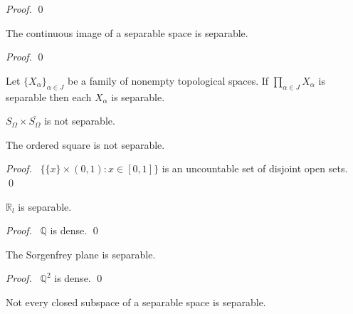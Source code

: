 \begin{proof}
 \pf
 \qed
\end{proof}

\begin{prop}
 The continuous image of a separable space is separable.
\end{prop}

\begin{proof}
 \pf
 \qed
\end{proof}

\begin{cor}
  Let $\{ X_\alpha \}_{\alpha \in J}$ be a family of nonempty topological
  spaces. If $\prod_{\alpha \in J} X_\alpha$ is separable then each
$X_\alpha$ is separable.
\end{cor}

\begin{cor}
  $S_\Omega \times \overline{S_\Omega}$ is not separable.
\end{cor}

\begin{prop}
The ordered square is not separable.
\end{prop}

\begin{proof}
 \pf\ $\{ \{x\} \times (0,1) : x \in [0,1] \}$ is an uncountable set of
disjoint open sets. \qed
\end{proof}

\begin{prop}
 $\mathbb{R}_l$ is separable.
\end{prop}

\begin{proof}
 \pf\ $\mathbb{Q}$ is dense. \qed
\end{proof}

\begin{prop}
The Sorgenfrey plane is separable.
\end{prop}

\begin{proof}
 \pf\ $\mathbb{Q}^2$ is dense. \qed
\end{proof}

\begin{prop}
 Not every closed subspace of a separable space is separable.
\end{prop}

